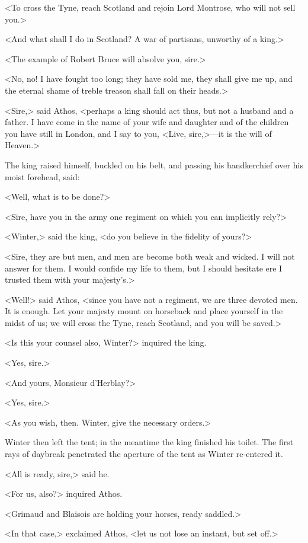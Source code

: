 <To cross the Tyne, reach Scotland and rejoin Lord Montrose, who will not sell you.>

<And what shall I do in Scotland? A war of partisans, unworthy of a king.>

<The example of Robert Bruce will absolve you, sire.>

<No, no! I have fought too long; they have sold me, they shall give me up, and the eternal shame of treble treason shall fall on their heads.>

<Sire,> said Athos, <perhaps a king should act thus, but not a husband and a father. I have come in the name of your wife and daughter and of the children you have still in London, and I say to you, <Live, sire,>—it is the will of Heaven.>

The king raised himself, buckled on his belt, and passing his handkerchief over his moist forehead, said:

<Well, what is to be done?>

<Sire, have you in the army one regiment on which you can implicitly rely?>

<Winter,> said the king, <do you believe in the fidelity of yours?>

<Sire, they are but men, and men are become both weak and wicked. I will not answer for them. I would confide my life to them, but I should hesitate ere I trusted them with your majesty's.>

<Well!> said Athos, <since you have not a regiment, we are three devoted men. It is enough. Let your majesty mount on horseback and place yourself in the midst of us; we will cross the Tyne, reach Scotland, and you will be saved.>

<Is this your counsel also, Winter?> inquired the king.

<Yes, sire.>

<And yours, Monsieur d'Herblay?>

<Yes, sire.>

<As you wish, then. Winter, give the necessary orders.>

Winter then left the tent; in the meantime the king finished his toilet. The first rays of daybreak penetrated the aperture of the tent as Winter re-entered it.

<All is ready, sire,> said he.

<For us, also?> inquired Athos.

<Grimaud and Blaisois are holding your horses, ready saddled.>

<In that case,> exclaimed Athos, <let us not lose an instant, but set off.>

